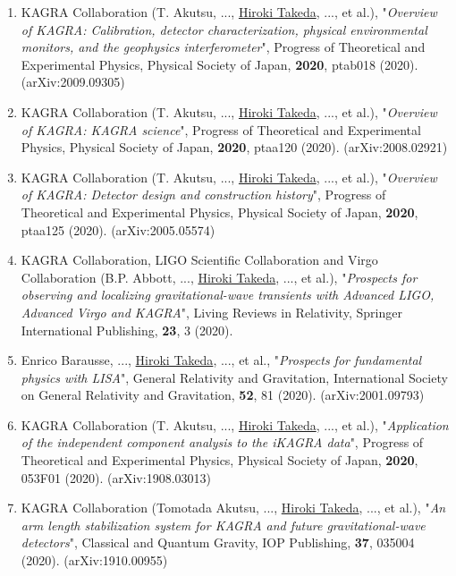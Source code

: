 \documentclass[uplatex, 11pt]{jsarticle}
\begin{document}
\begin{enumerate}
\item KAGRA Collaboration (T. Akutsu, ..., \uline{Hiroki Takeda}, ..., et al.), "\emph{Overview of KAGRA: Calibration, detector characterization, physical environmental monitors, and the geophysics interferometer}", Progress of Theoretical and Experimental Physics, Physical Society of Japan, {\bf 2020}, ptab018 (2020). (arXiv:2009.09305)\\

\item KAGRA Collaboration (T. Akutsu, ..., \uline{Hiroki Takeda}, ..., et al.), "\emph{Overview of KAGRA: KAGRA science}", Progress of Theoretical and Experimental Physics, Physical Society of Japan, {\bf 2020}, ptaa120 (2020). (arXiv:2008.02921)\\

\item KAGRA Collaboration (T. Akutsu, ..., \uline{Hiroki Takeda}, ..., et al.), "\emph{Overview of KAGRA: Detector design and construction history}", Progress of Theoretical and Experimental Physics, Physical Society of Japan, {\bf 2020}, ptaa125 (2020). (arXiv:2005.05574)\\

\item KAGRA Collaboration, LIGO Scientific Collaboration and Virgo Collaboration (B.P. Abbott, ..., \uline{Hiroki Takeda}, ..., et al.), "\emph{Prospects for observing and localizing gravitational-wave transients with Advanced LIGO, Advanced Virgo and KAGRA}", Living Reviews in Relativity, Springer International Publishing, {\bf 23}, 3 (2020).\\

\item Enrico Barausse, ..., \uline{Hiroki Takeda}, ..., et al., "\emph{Prospects for fundamental physics with LISA}", General Relativity and Gravitation, International Society on General Relativity and Gravitation, {\bf 52}, 81 (2020). (arXiv:2001.09793)\\

\item KAGRA Collaboration (T. Akutsu, ..., \uline{Hiroki Takeda}, ..., et al.), "\emph{Application of the independent component analysis to the iKAGRA data}", Progress of Theoretical and Experimental Physics, Physical Society of Japan, {\bf 2020}, 053F01 (2020). (arXiv:1908.03013)\\

\item KAGRA Collaboration (Tomotada Akutsu, ..., \uline{Hiroki Takeda}, ..., et al.), "\emph{An arm length stabilization system for KAGRA and future gravitational-wave detectors}", Classical and Quantum Gravity, IOP Publishing, {\bf 37}, 035004 (2020). (arXiv:1910.00955)\\


\end{enumerate}
\end{document}
